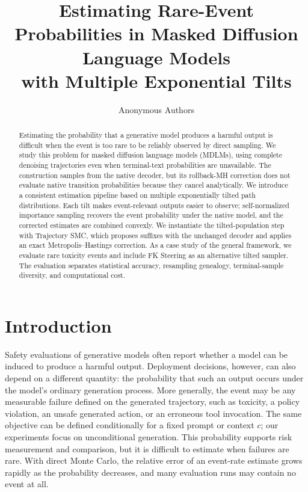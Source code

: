 \documentclass{article}
\title{Estimating Rare-Event Probabilities in Masked Diffusion Language Models\\
with Multiple Exponential Tilts}
\author{Anonymous Authors}
\begin{document}
\maketitle

\begin{abstract}
Estimating the probability that a generative model produces a harmful output
is difficult when the event is too rare to be reliably observed by direct
sampling. We study this problem for masked diffusion language models (MDLMs),
using complete denoising trajectories even when terminal-text probabilities
are unavailable. The construction samples from the native decoder, but its
rollback-MH correction does not evaluate native transition probabilities
because they cancel analytically. We introduce a consistent estimation
pipeline based on multiple exponentially tilted path distributions. Each tilt
makes event-relevant outputs easier to observe; self-normalized importance
sampling recovers the event probability under the native model, and the
corrected estimates are combined convexly. We instantiate the tilted-population
step with Trajectory SMC, which proposes suffixes with the unchanged decoder
and applies an exact Metropolis--Hastings correction. As a case study of the
general framework, we evaluate rare toxicity events and include FK Steering as
an alternative tilted sampler. The evaluation separates statistical accuracy,
resampling genealogy, terminal-sample diversity, and computational cost.
\end{abstract}

\section{Introduction}

Safety evaluations of generative models often report whether a model can be
induced to produce a harmful output. Deployment decisions, however, can also
depend on a different quantity: the probability that such an output occurs
under the model's ordinary generation process. More generally, the event may
be any measurable failure defined on the generated trajectory, such as
toxicity, a policy violation, an unsafe generated action, or an erroneous tool
invocation. The same objective can be defined conditionally for a fixed prompt
or context $c$; our experiments focus on unconditional generation. This
probability supports risk measurement and comparison, but it is difficult to
estimate when failures are rare. With direct Monte Carlo, the relative error
of an event-rate estimate grows rapidly as the probability decreases, and many
evaluation runs may contain no event at all.
\end{document}
